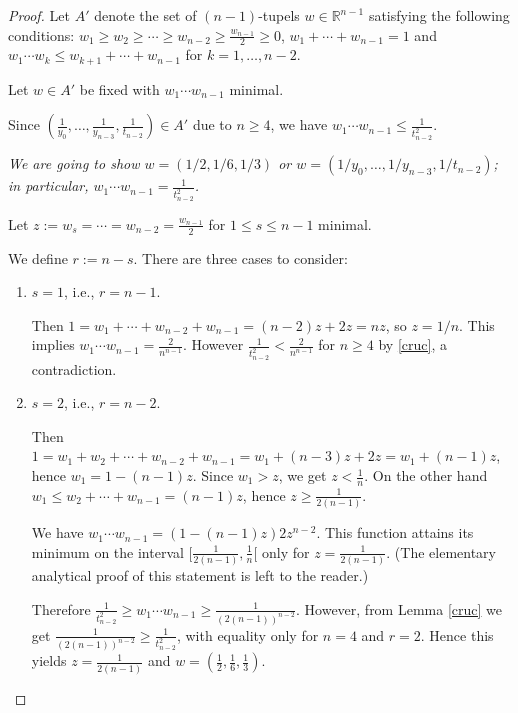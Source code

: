 \documentclass[a4paper,twoside]{article}
\def\R{{\mathbb R}}
\begin{document}
\begin{proof}
Let $A'$ denote the set of $(n-1)$-tupels $w \in \R^{n-1}$ satisfying the following conditions: 
$w_1 \geq w_2 \geq \cdots \geq w_{n-2} \geq \frac{w_{n-1}}{2} \geq 0$, 
$w_1 + \cdots + w_{n-1} = 1$ and $w_1 \cdots w_k \leq w_{k+1} + \cdots + w_{n-1}$ for $k = 1, \ldots, n-2$.

Let $w \in A'$ be fixed with $w_1 \cdots w_{n-1}$ minimal. 

Since $(\frac{1}{y_0}, \ldots, \frac{1}{y_{n-3}}, \frac{1}{t_{n-2}}) \in A'$ due to $n \geq 4$, 
we have $w_1 \cdots w_{n-1} \leq \frac{1}{t_{n-2}^2}$.

\smallskip

{\em We are going to show $w = (1/2,1/6,1/3)$ or $w = (1/y_0, \ldots, 1/y_{n-3}, 1/t_{n-2})$; 
in particular, $w_1 \cdots w_{n-1} = \frac{1}{t_{n-2}^2}$.}

\smallskip

Let $z := w_s = \cdots = w_{n-2} = \frac{w_{n-1}}{2}$ for $1 \leq s \leq n-1$ minimal. 

We define $r := n-s$. There are three cases to consider:

\begin{enumerate}
\item $s=1$, i.e., $r=n-1$.

Then $1 = w_1 + \cdots + w_{n-2} + w_{n-1} = (n-2) z + 2 z = n z$, so $z = 1/n$. This implies 
$w_1 \cdots w_{n-1} = \frac{2}{n^{n-1}}$. However $\frac{1}{t_{n-2}^2} < \frac{2}{n^{n-1}}$ for $n \geq 4$ 
by \ref{cruc}, a contradiction.

\item $s=2$, i.e., $r=n-2$.

Then $1 = w_1 + w_2 + \cdots + w_{n-2} + w_{n-1} = w_1 + (n-3) z + 2z = w_1 + (n-1) z$, hence 
$w_1 = 1 - (n-1) z$. Since $w_1 > z$, we get $z < \frac{1}{n}$. On the other hand 
$w_1 \leq w_2 + \cdots + w_{n-1} = (n-1)z$, hence $z \geq \frac{1}{2(n-1)}$. 

We have $w_1 \cdots w_{n-1} = (1-(n-1) z) 2 z^{n-2}$. This function attains its minimum on the interval 
$[\frac{1}{2(n-1)}, \frac{1}{n}[$ only for $z = \frac{1}{2(n-1)}$. (The elementary analytical proof of this statement is left to the reader.)

Therefore 
$\frac{1}{t_{n-2}^2} \geq w_1 \cdots w_{n-1} \geq \frac{1}{{(2(n-1))}^{n-2}}$. However, from Lemma \ref{cruc} 
we get $\frac{1}{{(2(n-1))}^{n-2}} \geq \frac{1}{t_{n-2}^2}$, with equality only for $n=4$ and $r=2$. Hence this yields 
$z = \frac{1}{2(n-1)}$ and  $w = (\frac{1}{2},\frac{1}{6},\frac{1}{3})$.


\end{enumerate}
\end{proof}
\end{document}
